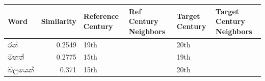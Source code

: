 ﻿\begin{tabular}{lrllll}
\toprule
Word & Similarity & Reference Century & Ref Century Neighbors & Target Century & Target Century Neighbors \\
\midrule
රන් & 0.2549 & 19th & & 20th & \\
මහත් & 0.2775 & 15th & & 19th & \\
බලයෙන් & 0.371 & 15th & & 20th & \\
\bottomrule
\end{tabular}
